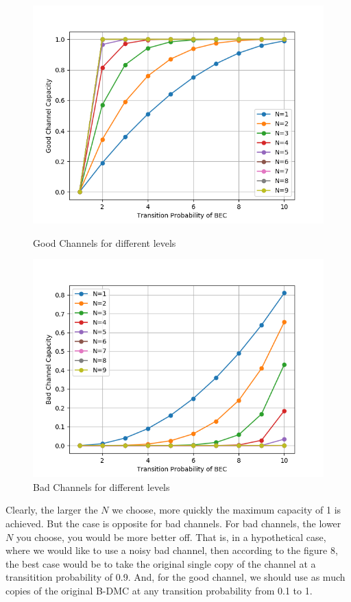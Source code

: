 \documentclass{report}
\begin{document}
\begin{figure}[H]
\centering
\begin{minipage}{0.49\textwidth}
\includegraphics[width=\linewidth]{good_channels.png}
\caption{Good Channels for different levels}
\end{minipage}
\begin{minipage}{0.49\textwidth}
\includegraphics[width=\linewidth]{bad_channels.png}
\caption{Bad Channels for different levels}
\end{minipage}
\end{figure}
Clearly, the larger the $N$ we choose, more quickly the maximum capacity of 1 is achieved. But the case is opposite for bad channels. For bad channels, the lower $N$ you choose, you would be more better off. That is, in a hypothetical case, where we would like to use a noisy bad channel, then according to the figure 8, the best case would be to take the original single copy of the channel at a transitition probability of 0.9. And, for the good channel, we should use as much copies of the original B-DMC at any transition probability from 0.1 to 1.
\end{document}
